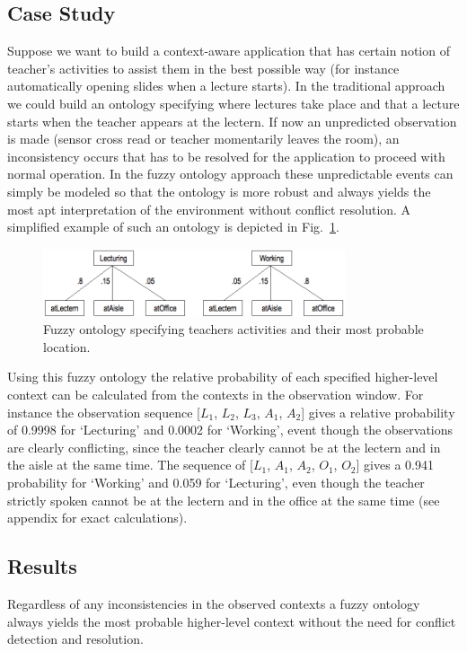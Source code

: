 \documentclass[journal]{vgtc}                %
\begin{document}
\subsection{Case Study}
Suppose we want to build a context-aware application that has certain notion of teacher's activities to assist them in the best possible way (for instance automatically opening slides when a lecture starts). In the traditional approach we could build an ontology specifying where lectures take place and that a lecture starts when the teacher appears at the lectern. If now an unpredicted observation is made (sensor cross read or teacher momentarily leaves the room), an inconsistency occurs that has to be resolved for the application to proceed with normal operation. In the fuzzy ontology approach these unpredictable events can simply be modeled so that the ontology is more robust and always yields the most apt interpretation of the environment without conflict resolution. A simplified example of such an ontology is depicted in Fig.~\ref{fig:fuzzy}.
\begin{figure}[htb]
  \centering
  \includegraphics[width=3.5in]{fuzzy}
  \caption{Fuzzy ontology specifying teachers activities and their most probable location.}
  \label{fig:fuzzy}
\end{figure}
Using this fuzzy ontology the relative probability of each specified higher-level context can be calculated from the contexts in the observation window. For instance the observation sequence [$L_1$, $L_2$, $L_3$, $A_1$, $A_2$] gives a relative probability of 0.9998 for `Lecturing' and 0.0002 for `Working', event though the observations are clearly conflicting, since the teacher clearly cannot be at the lectern and in the aisle at the same time. The sequence of [$L_1$, $A_1$, $A_2$, $O_1$, $O_2$] gives a 0.941 probability for `Working' and 0.059 for `Lecturing', even though the teacher strictly spoken cannot be at the lectern and in the office at the same time (see appendix for exact calculations). 

\subsection{Results}
Regardless of any inconsistencies in the observed contexts a fuzzy ontology always yields the most probable higher-level context without the need for conflict detection and resolution.
\end{document}
